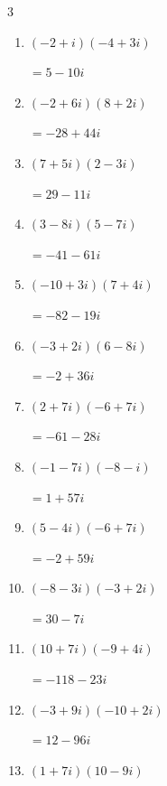 \begin{multicols}{3}
\begin{enumerate}
        $\displaystyle =-108+46i$

  \item $\displaystyle (-2+i)(-4+3i)$

        $\displaystyle =5-10i$

  \item $\displaystyle (-2+6i)(8+2i)$

        $\displaystyle =-28+44i$

  \item $\displaystyle (7+5i)(2-3i)$

        $\displaystyle =29-11i$

  \item $\displaystyle (3-8i)(5-7i)$

        $\displaystyle =-41-61i$

\columnbreak %

\resetques

  \item $\displaystyle (-10+3i)(7+4i)$

        $\displaystyle =-82-19i$

  \item $\displaystyle (-3+2i)(6-8i)$

        $\displaystyle =-2+36i$

  \item $\displaystyle (2+7i)(-6+7i)$

        $\displaystyle =-61-28i$

  \item $\displaystyle (-1-7i)(-8-i)$

        $\displaystyle =1+57i$

  \item $\displaystyle (5-4i)(-6+7i)$

        $\displaystyle =-2+59i$

  \item $\displaystyle (-8-3i)(-3+2i)$

        $\displaystyle =30-7i$

  \item $\displaystyle (10+7i)(-9+4i)$

        $\displaystyle =-118-23i$

  \item $\displaystyle (-3+9i)(-10+2i)$

        $\displaystyle =12-96i$

  \item $\displaystyle (1+7i)(10-9i)$


\end{enumerate}
\end{multicols}
